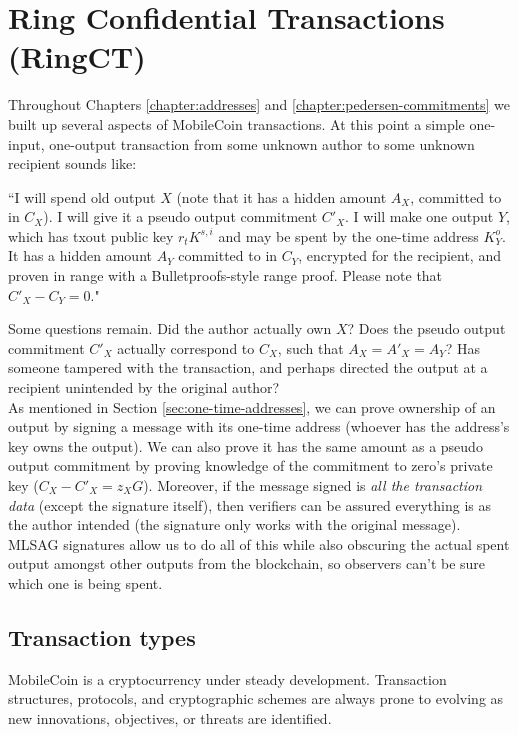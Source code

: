 \chapter{Ring Confidential Transactions (RingCT)}
\label{chapter:transactions}

Throughout Chapters \ref{chapter:addresses} and \ref{chapter:pedersen-commitments} we built up several aspects of MobileCoin transactions. At this point a simple one-input, one-output transaction from some unknown author to some unknown recipient sounds like:

``I will spend old output $X$ (note that it has a hidden amount $A_X$, committed to in $C_X$). I will give it a pseudo output commitment $C'_X$. I will make one output $Y$, which has txout public key $r_t K^{s,i}$ and may be spent by the one-time address $K^o_Y$. It has a hidden amount $A_Y$ committed to in $C_Y$, encrypted for the recipient, and proven in range with a Bulletproofs-style range proof. Please note that $C'_X - C_Y = 0$."

Some questions remain. Did the author actually own $X$? Does the pseudo output commitment $C'_X$ actually correspond to $C_X$, such that $A_X = A'_X = A_Y$? Has someone tampered with the transaction, and perhaps directed the output at a recipient unintended by the original author?
\\

As mentioned in Section \ref{sec:one-time-addresses}, we can prove ownership of an output by signing a message with its one-time address (whoever has the address's key owns the output). We can also prove it has the same amount as a pseudo output commitment by proving knowledge of the commitment to zero's private key ($C_X - C'_X = z_X G$). Moreover, if the message signed is {\em all the transaction data} (except the signature itself), then verifiers can be assured everything is as the author intended (the signature only works with the original message). MLSAG signatures allow us to do all of this while also obscuring the actual spent output amongst other outputs from the blockchain, so observers can't be sure which one is being spent.



\section{Transaction types}
\label{sec:transaction_types}

MobileCoin is a cryptocurrency under steady development. Transaction structures, protocols, and cryptographic schemes are always prone to evolving as new innovations, objectives, or threats are identified.

